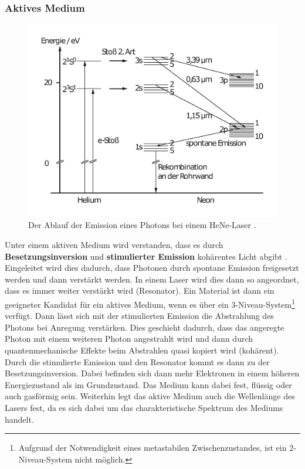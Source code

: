 \subsubsection*{Aktives Medium}
\begin{figure}
    \includegraphics[width=0.8\linewidth]{pictures/HeNe_levels.pdf}
    \caption{Der Ablauf der Emission eines Photons bei einem HeNe-Laser \cite{HeNe_levels}.}
    \label{fig:HeNe_levels}
\end{figure}
Unter einem aktiven Medium wird verstanden, dass es durch \textbf{Besetzungsinversion} und \textbf{stimulierter Emission} kohärentes Licht abgibt \cite{demtroeder_laser}.
Eingeleitet wird dies dadurch, dass Photonen durch spontane Emission freigesetzt werden und dann verstärkt werden.
In einem Laser wird dies dann so angeordnet, dass es immer weiter verstärkt wird (Resonator).
Ein Material ist dann ein geeigneter Kandidat für ein aktives Medium, wenn es über ein 3-Niveau-System\footnote{Aufgrund der Notwendigkeit eines metastabilen Zwischenzustandes, ist ein 2-Niveau-System nicht möglich.} verfügt.
Dann lässt sich mit der stimulierten Emission die Abstrahlung des Photons bei Anregung verstärken.
Dies geschieht dadurch, dass das angeregte Photon mit einem weiteren Photon angestrahlt wird und dann durch quantenmechanische Effekte beim Abstrahlen quasi kopiert wird (kohärent).
Durch die stimulierte Emission und den Resonator kommt es dann zu der Besetzungsinversion.
Dabei befinden sich dann mehr Elektronen in einem höheren Energiezustand als im Grundzustand.
Das Medium kann dabei fest, flüssig oder auch gasförmig sein.
Weiterhin legt das aktive Medium auch die Wellenlänge des Lasers fest, da es sich dabei um das charakteristische Spektrum des Mediums handelt.

